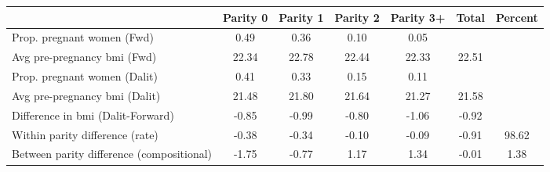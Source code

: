 \begin{tabular}{l*{6}{c}}
\toprule
            &\multicolumn{1}{c}{Parity 0}&\multicolumn{1}{c}{Parity 1}&\multicolumn{1}{c}{Parity 2}&\multicolumn{1}{c}{Parity 3+}&\multicolumn{1}{c}{Total}&\multicolumn{1}{c}{Percent}\\
\midrule
\midrule
Prop. pregnant women (Fwd)&        0.49&        0.36&        0.10&        0.05&            &            \\
Avg pre-pregnancy bmi (Fwd)&       22.34&       22.78&       22.44&       22.33&       22.51&            \\
Prop. pregnant women (Dalit)&        0.41&        0.33&        0.15&        0.11&            &            \\
Avg pre-pregnancy bmi (Dalit)&       21.48&       21.80&       21.64&       21.27&       21.58&            \\
Difference in bmi (Dalit-Forward)&       -0.85&       -0.99&       -0.80&       -1.06&       -0.92&            \\
Within parity difference (rate)&       -0.38&       -0.34&       -0.10&       -0.09&       -0.91&       98.62\\
Between parity difference (compositional)&       -1.75&       -0.77&        1.17&        1.34&       -0.01&        1.38\\
\bottomrule
\end{tabular}
